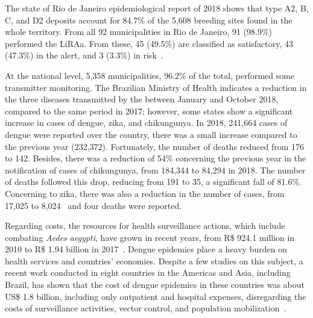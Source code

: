 %
The state of Rio de Janeiro epidemiological report of 2018 shows that type A2, B, C, and D2 deposits account for 84.7\% of the 5,608 breeding sites found in the whole territory.
%
From all 92 municipalities in Rio de Janeiro, 91 (98.9\%) performed the LiRAa.
From these, 45 (49.5\%) are classified as satisfactory, 43 (47.3\%) in the alert, and 3 (3.3\%) in risk~\cite{rj2018epid52018}.


At the national level, 5,358 municipalities, 96.2\% of the total, performed some transmitter monitoring.
The Brazilian Ministry of Health indicates a reduction in the three diseases transmitted by the \Aedes between January and October 2018, compared to the same period in 2017; however, some states show a significant increase in cases of dengue, zika, and chikungunya.
In 2018, 241,664 cases of dengue were reported over the country, there was a small increase compared to the previous year (232,372).
Fortunately, the number of deaths reduced from 176 to 142.
%
Besides, there was a reduction of 54\% concerning the previous year in the notification of cases of chikungunya, from 184,344 to 84,294 in 2018.
The number of deaths followed this drop, reducing from 191 to 35, a significant fall of 81.6\%.
%
Concerning to zika, there was also a reduction in the number of cases, from 17,025 to 8,024~\cite{web:brasil2018liraa} and four deaths were reported.

Regarding costs, the resources for health surveillance actions, which include combating \textit{Aedes aegypti}, have grown in recent years, from R\$ 924.1 million in 2010 to R\$ 1.94 billion in 2017~\cite{brasil2018surto}.
Dengue epidemics place a heavy burden on health services and countries' economies.
Despite a few studies on this subject, a recent work conducted in eight countries in the Americas and Asia, including Brazil, has shown that the cost of dengue epidemics in these countries was about US\$ 1.8 billion, including only outpatient and hospital expenses, disregarding the costs of surveillance activities, vector control, and population mobilization~\cite{brasil2009diretrizes}.


